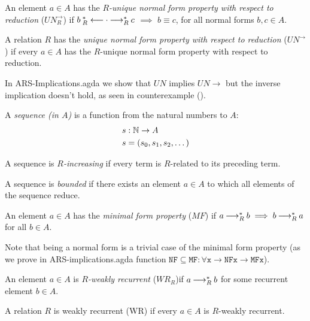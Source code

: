 \begin{definition}
An element $a \in A$ has the \emph{${R}$-unique normal form property with respect to reduction} ($UN^ \to _{R}$) if
$b \mathbin{_R^*\longleftarrow}  \cdot  \mathbin{\longrightarrow_R^*} c$  $\implies$ $b \equiv c$, for all normal forms $b,c \in A$.

A relation $R$ has the \emph{unique normal form property with respect to reduction} ($UN^\to$) if every $a \in A$ has the
$R$-unique normal form property with respect to reduction.
\end{definition}
In ARS-Implications.agda we show that $UN$ implies $UN\to$ but the inverse implication doesn't hold, as seen 
in counterexample ().

\begin{definition}
    A \emph{sequence (in $A$)} is a function from the natural numbers to $A$:
    \begin{align*}
      &s : \mathbb{N} \to A \\
      &s = (s_0,s_1,s_2,\dots)
    \end{align*}
\end{definition}
  
\begin{definition}
    A sequence is \emph{$R$-increasing} if every term is $R$-related to its preceding term.
\end{definition}
  
\begin{definition}
    A sequence is \emph{bounded} if there exists an element $a \in A$ to which all elements of the sequence reduce.
\end{definition}

\begin{definition}
    An element $a \in A$ has the \emph{minimal form property} ($MF$) if $a \mathbin{\longrightarrow_R^*} b \implies b \mathbin{\longrightarrow_R^*} a$ for all $b \in A$.
\end{definition}

Note that being a normal form is a trivial case of the minimal form property (as we prove in ARS-implications.agda 
function $\mathtt{NF\subseteq MF : \forall {x} \to NF x \to MF x}$).

\begin{definition}
    An element $a \in A$ is \emph{$R$-weakly recurrent} ($WR_{R}$)if $a \mathbin{\longrightarrow_R^*} b$ for some recurrent element $b \in A$.
  
    A relation $R$ is weakly recurrent (WR) if every $a \in A$ is $R$-weakly recurrent.
\end{definition}

